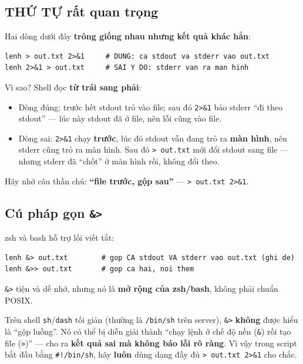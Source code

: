 \documentclass[12pt,a4paper]{article}
\newcommand{\cmd}[1]{\texttt{#1}}
\begin{document}
\subsection{THỨ TỰ rất quan trọng}

Hai dòng dưới đây \textbf{trông giống nhau nhưng kết quả khác hẳn}:

\begin{Verbatim}
lenh > out.txt 2>&1     # DUNG: ca stdout va stderr vao out.txt
lenh 2>&1 > out.txt     # SAI Y DO: stderr van ra man hinh
\end{Verbatim}

Vì sao? Shell đọc \textbf{từ trái sang phải}:

\begin{itemize}[leftmargin=1.4em]
\item Dòng đúng: trước hết stdout trỏ vào file; sau đó \cmd{2>\&1} bảo stderr ``đi theo stdout'' --- lúc này stdout đã ở file, nên lỗi cũng vào file.
\item Dòng sai: \cmd{2>\&1} chạy \textbf{trước}, lúc đó stdout vẫn đang trỏ ra \textbf{màn hình}, nên stderr cũng trỏ ra màn hình. Sau đó \cmd{> out.txt} mới đổi stdout sang file --- nhưng stderr đã ``chốt'' ở màn hình rồi, không đổi theo.
\end{itemize}

Hãy nhớ câu thần chú: \textbf{``file trước, gộp sau''} --- \cmd{> out.txt 2>\&1}.

\subsection{Cú pháp gọn \texttt{\&>}}

zsh và bash hỗ trợ lối viết tắt:

\begin{Verbatim}
lenh &> out.txt        # gop CA stdout VA stderr vao out.txt (ghi de)
lenh &>> out.txt       # gop ca hai, noi them
\end{Verbatim}

\cmd{\&>} tiện và dễ nhớ, nhưng nó là \textbf{mở rộng của zsh/bash}, không phải chuẩn POSIX.

\begin{dangerbox}[title={Cảnh báo dành cho script}]
Trên shell \cmd{sh}/\cmd{dash} tối giản (thường là \cmd{/bin/sh} trên server), \cmd{\&>} \textbf{không} được hiểu là ``gộp luồng''. Nó có thể bị diễn giải thành ``chạy lệnh ở chế độ nền (\cmd{\&}) rồi tạo file (\cmd{>})'' --- cho ra \textbf{kết quả sai mà không báo lỗi rõ ràng}. Vì vậy trong script bắt đầu bằng \cmd{\#!/bin/sh}, hãy \textbf{luôn} dùng dạng đầy đủ \cmd{> out.txt 2>\&1} cho chắc.
\end{dangerbox}
\end{document}

